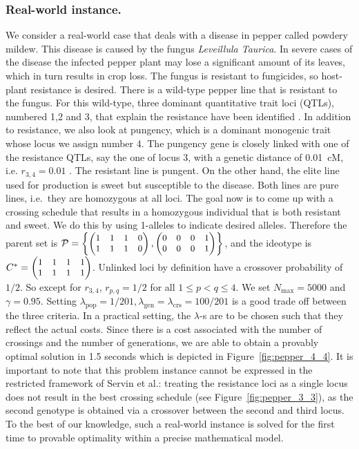 \documentclass[runningheads]{llncs}
\begin{document}
\subsubsection{Real-world instance.} We consider a real-world case that deals with a
disease in pepper called powdery mildew. This disease is caused by the fungus
\emph{Leveillula Taurica}. In severe cases of the disease the infected pepper plant may lose a
significant amount of its leaves, which in turn results in crop loss. The
fungus is resistant to fungicides, so host-plant resistance is desired.
There is a wild-type pepper line that is resistant to the fungus. For this wild-type, three dominant quantitative trait loci (QTLs), numbered 1,2 and 3, that explain the resistance have been identified \cite{Chifriss:1992}. In addition to resistance, we also look at pungency, which is a dominant monogenic trait whose locus we assign number 4. The pungency gene is closely linked with one of the resistance QTLs, say the one of locus 3, with a genetic distance
of 0.01~cM, i.e. $r_{3,4} = 0.01$ \cite{Haldane:1919}. The resistant line is pungent. On the other hand, the elite line used for production is sweet but susceptible to the disease. Both lines are pure lines, i.e.\ they are homozygous at all loci. The goal now is to come up with a crossing schedule that results in a homozygous individual that is both resistant and sweet. 
We do this by using 1-alleles to indicate desired alleles. Therefore the parent set is 
$\mathcal{P} = \small \left\{
  \begin{pmatrix}
    1 & 1 & 1 & 0\\
    1 & 1 & 1 & 0
  \end{pmatrix}
  ,
  \begin{pmatrix}
    0 & 0 & 0 & 1\\
    0 & 0 & 0 & 1
  \end{pmatrix}
  \right\}$, and the ideotype is
  $C^* = \small
  \begin{pmatrix}
    1 & 1 & 1 & 1\\
    1 & 1 & 1 & 1
  \end{pmatrix}$. Unlinked loci by definition have a crossover probability of $1/2$. So except for $r_{3,4}$, $r_{p,q} = 1/2$ for all $1 \leq p < q \leq 4$. We set $N_\mathrm{max} = 5000$ and $\gamma = 0.95$. Setting $\lambda_\mathrm{pop} = 1/201, \lambda_\mathrm{gen} = \lambda_\mathrm{crs} = 100/201$ is a good trade off between the three criteria. In a practical setting, the $\lambda$-s are to be chosen such that they reflect the actual costs. Since there is a cost associated with the number of crossings and the number of generations, we are able to obtain a provably optimal solution in 1.5 seconds which is depicted in Figure~\ref{fig:pepper_4_4}. It is important to note that this problem instance cannot be expressed in the restricted framework of Servin et al.\cite{Servin:2004}: treating the resistance loci as a single locus does not result in the best crossing schedule (see Figure~\ref{fig:pepper_3_3}), as the second genotype is obtained via a crossover between the second and third locus. To the best of our knowledge, such a real-world instance is solved for the first time to provable optimality within a precise mathematical model.
\end{document}
